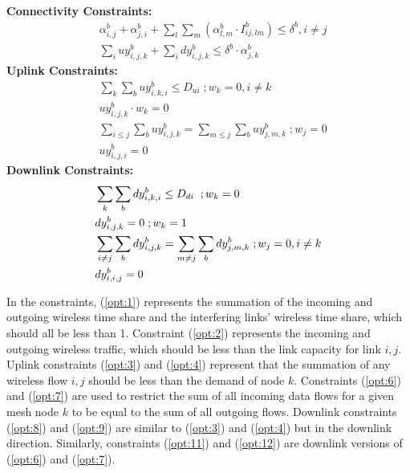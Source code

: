 \noindent
{\bf Connectivity Constraints:}
\begin{align}
\label{opt:1}
& \alpha_{i,j}^b + \alpha_{j,i}^b + \sum_l\sum_m(\alpha_{l,m}^b \cdot I_{ij,lm}^b) \leq \delta^b, i\neq j \\
\label{opt:2}
& \sum_i uy_{i,j,k}^b + \sum_i dy_{i,j,k}^b \leq \delta^b \cdot \alpha_{j,k}^b 
\end{align}
\noindent
{\bf Uplink Constraints:} 
\begin{align}
\label{opt:3}
& \sum_k \sum_b uy_{i,k,i}^b \leq D_{ui}  \; ; w_k=0, i \neq k \\
\label{opt:4}
& uy_{i,j,k}^b \cdot w_k = 0 \\
\label{opt:6}
& \sum_{i\leq j}\sum_b uy_{i,j,k}^b = \sum_{m\leq j} \sum_b uy_{j,m,k}^b \; ;w_j = 0\\
\label{opt:7}
& uy_{i,j,i}^b=0 
\end{align}
\noindent
{\bf Downlink Constraints:} 
\begin{align}
{\bf}
\label{opt:8}
& \sum_k \sum_b dy_{i,k,i}^b \leq D_{di} \; \; ; w_k=0 \\
\label{opt:9}
& dy_{i,j,k}^b =0  \; ;w_k=1 \\
\label{opt:11}
& \sum_{i\neq j} \sum_b dy_{i,j,k}^b = \sum_{m \neq j} \sum_b dy_{j,m,k}^b   \; ; w_j=0, i \neq k \\
\label{opt:12}
& dy_{i,i,j}^b=0
\end{align}

In the constraints, (\ref{opt:1}) represents the summation of the incoming and outgoing wireless time 
share and the interfering links' wireless time share, which should all be less than 1. Constraint (\ref{opt:2}) 
represents the incoming and outgoing wireless traffic, which should be less than the link capacity for 
link $i,j$. Uplink constraints (\ref{opt:3}) and (\ref{opt:4}) represent that the summation of any wireless 
flow $i,j$ should be less than the demand of node $k$.  Constraints (\ref{opt:6}) and (\ref{opt:7}) are used 
to restrict the sum of all incoming data flows for a given mesh node $k$ to be equal to the sum of all outgoing 
flows. Downlink constraints (\ref{opt:8}) and (\ref{opt:9}) are similar to (\ref{opt:3}) and (\ref{opt:4}) but 
in the downlink direction.  Similarly, constraints (\ref{opt:11}) and (\ref{opt:12}) are downlink versions of 
(\ref{opt:6}) and (\ref{opt:7}).

